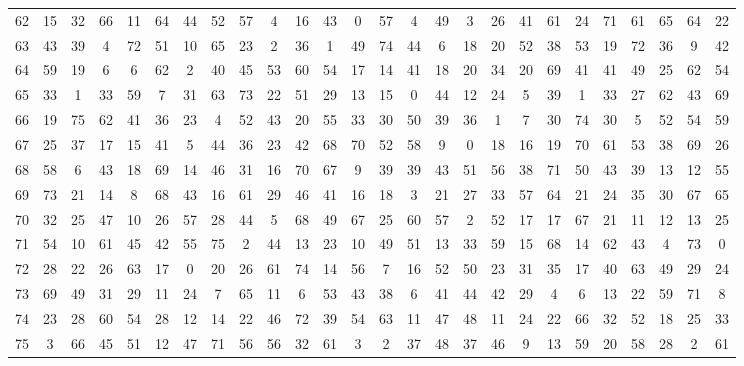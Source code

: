 \begin{table}
\begin{tabular}{c c c c c c c c c c c c c c c c c c c c c c c c c c }
62 & 15 & 32 & 66 & 11 & 64 & 44 & 52 & 57 & 4 & 16 & 43 & 0 & 57 & 4 & 49 & 3 & 26 & 41 & 61 & 24 & 71 & 61 & 65 & 64 & 22 \\
63 & 43 & 39 & 4 & 72 & 51 & 10 & 65 & 23 & 2 & 36 & 1 & 49 & 74 & 44 & 6 & 18 & 20 & 52 & 38 & 53 & 19 & 72 & 36 & 9 & 42 \\
64 & 59 & 19 & 6 & 6 & 62 & 2 & 40 & 45 & 53 & 60 & 54 & 17 & 14 & 41 & 18 & 20 & 34 & 20 & 69 & 41 & 41 & 49 & 25 & 62 & 54 \\
65 & 33 & 1 & 33 & 59 & 7 & 31 & 63 & 73 & 22 & 51 & 29 & 13 & 15 & 0 & 44 & 12 & 24 & 5 & 39 & 1 & 33 & 27 & 62 & 43 & 69 \\
66 & 19 & 75 & 62 & 41 & 36 & 23 & 4 & 52 & 43 & 20 & 55 & 33 & 30 & 50 & 39 & 36 & 1 & 7 & 30 & 74 & 30 & 5 & 52 & 54 & 59 \\
67 & 25 & 37 & 17 & 15 & 41 & 5 & 44 & 36 & 23 & 42 & 68 & 70 & 52 & 58 & 9 & 0 & 18 & 16 & 19 & 70 & 61 & 53 & 38 & 69 & 26 \\
68 & 58 & 6 & 43 & 18 & 69 & 14 & 46 & 31 & 16 & 70 & 67 & 9 & 39 & 39 & 43 & 51 & 56 & 38 & 71 & 50 & 43 & 39 & 13 & 12 & 55 \\
69 & 73 & 21 & 14 & 8 & 68 & 43 & 16 & 61 & 29 & 46 & 41 & 16 & 18 & 3 & 21 & 27 & 33 & 57 & 64 & 21 & 24 & 35 & 30 & 67 & 65 \\
70 & 32 & 25 & 47 & 10 & 26 & 57 & 28 & 44 & 5 & 68 & 49 & 67 & 25 & 60 & 57 & 2 & 52 & 17 & 17 & 67 & 21 & 11 & 12 & 13 & 25 \\
71 & 54 & 10 & 61 & 45 & 42 & 55 & 75 & 2 & 44 & 13 & 23 & 10 & 49 & 51 & 13 & 33 & 59 & 15 & 68 & 14 & 62 & 43 & 4 & 73 & 0 \\
72 & 28 & 22 & 26 & 63 & 17 & 0 & 20 & 26 & 61 & 74 & 14 & 56 & 7 & 16 & 52 & 50 & 23 & 31 & 35 & 17 & 40 & 63 & 49 & 29 & 24 \\
73 & 69 & 49 & 31 & 29 & 11 & 24 & 7 & 65 & 11 & 6 & 53 & 43 & 38 & 6 & 41 & 44 & 42 & 29 & 4 & 6 & 13 & 22 & 59 & 71 & 8 \\
74 & 23 & 28 & 60 & 54 & 28 & 12 & 14 & 22 & 46 & 72 & 39 & 54 & 63 & 11 & 47 & 48 & 11 & 24 & 22 & 66 & 32 & 52 & 18 & 25 & 33 \\
75 & 3 & 66 & 45 & 51 & 12 & 47 & 71 & 56 & 56 & 32 & 61 & 3 & 2 & 37 & 48 & 37 & 46 & 9 & 13 & 59 & 20 & 58 & 28 & 2 & 61 \\
\hline
\end{tabular}
\end{table}